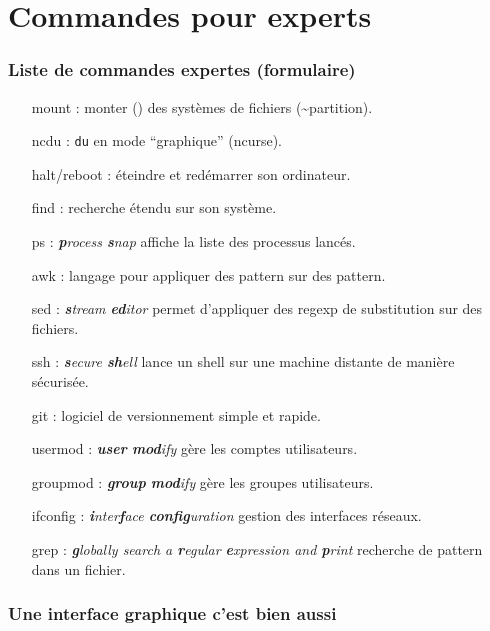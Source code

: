 \documentclass[french, a4paper, 12pt, titlepage]{article}
\begin{document}
\newpage

\part{Commandes pour experts}

\section{Liste de commandes expertes (formulaire)}
\begin{enumerate}
	\item[mount]: monter () des systèmes de fichiers (\~{}partition).
	\item[ncdu]: \lstinline'du' en mode ``graphique'' (ncurse).
	\item[halt/reboot]: éteindre et redémarrer son ordinateur.
	\item[find]: recherche étendu sur son système.
	\item[ps]: \emph{\textbf{p}rocess \textbf{s}nap} affiche la liste des
		processus lancés.
	\item[awk]: langage pour appliquer des pattern sur des pattern.
	\item[sed]: \emph{\textbf{s}tream \textbf{ed}itor} permet d'appliquer des
		regexp de substitution sur des fichiers.
	\item[ssh]: \emph{\textbf{s}ecure \textbf{sh}ell} lance un shell sur une
		machine distante de manière sécurisée.
	\item[git]: logiciel de versionnement simple et rapide.
	\item[usermod]: \emph{\textbf{user} \textbf{mod}ify} gère les comptes
		utilisateurs.
	\item[groupmod]: \emph{\textbf{group} \textbf{mod}ify} gère les groupes
		utilisateurs.
	\item[ifconfig]: \emph{\textbf{i}nter\textbf{f}ace \textbf{config}uration}
		gestion des interfaces réseaux.
	\item[grep]: \emph{\textbf{g}lobally search a \textbf{r}egular
			\textbf{e}xpression and \textbf{p}rint} recherche de pattern dans
		un fichier.
\end{enumerate}















\section{Une interface graphique c'est bien aussi}
\end{document}
